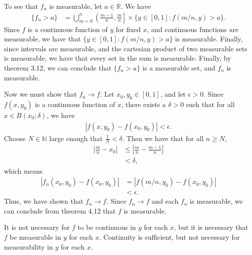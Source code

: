 \documentclass[10pt,a4paper]{article}
\theoremstyle{theorem}
\theoremstyle{definition}
\begin{document}
To see that $f_n$ is measurable, let $a \in \mathbb{R}$. We have
\begin{align*}
\{f_n > a \} &= \bigcup_{m = 0}^n \left(\frac{m-1}{n},  \frac{m}{n}\right] \times \{y \in [0, 1]: f(m/n, y) > a \}.
\end{align*}
Since $f$ is a continuous function of $y$ for fixed $x$, and continuous functions are measurable, we have that $\{y \in [0, 1]: f(m/n, y) > a \}$ is measurable. Finally, since intervals are measurable, and the cartesian product of two measurable sets is measurable, we have that every set in the sum is measurable. Finally, by theorem 3.12, we can conclude that $\{f_n > a \}$ is a measurable set, and $f_n$ is measurable.

Now we must show that $f_n \to f$. Let $x_0, y_0 \in [0, 1]$, and let $\epsilon > 0$.  Since $f(x, y_0)$ is a continuous function of $x$, there exists a $\delta > 0$ such that for all $x \in B(x_0; \delta)$, we have
\begin{align*}
|f(x, y_0) - f(x_0, y_0)| < \epsilon.
\end{align*}
Choose $N \in \mathbb{N}$ large enough that $\frac{1}{N} < \delta$. Then we have that for all $n \geq N$,
\begin{align*}
|\frac{m}{n} - x_0| &\leq |\frac{m}{n} - \frac{m - 1}{n}|\\
&< \delta,
\end{align*}
which means
\begin{align*}
|f_n(x_0, y_0) - f(x_0, y_0)| &= |f(m/n, y_0) - f(x_0, y_0)|\\
&< \epsilon.
\end{align*}
Thus, we have shown that $f_n \to f$.  Since $f_n \to f$ and each $f_n$ is measurable, we can conclude from theorem 4.12 that $f$ is measurable.

It is not necessary for $f$ to be continuous in $y$ for each $x$, but it is necessary that $f$ be measurable in $y$ for each $x$. Continuity is sufficient, but not necessary for measurability in  $y$ for each $x$.
\end{document}
